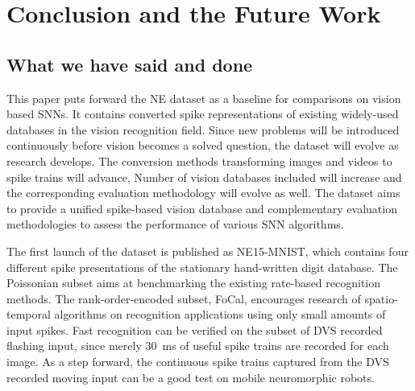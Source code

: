 \section{Conclusion and the Future Work}
\label{sec:summ}
\subsection{What we have said and done}
%
%

This paper puts forward the NE dataset as a baseline for comparisons on vision based SNNs.
It contains converted spike representations of existing widely-used databases in the vision recognition field.
Since new problems will be introduced continuously before vision becomes a solved question, the dataset will evolve as research develops. 
The conversion methods transforming images and videos to spike trains will advance, Number of vision databases included will increase and the corresponding evaluation methodology will evolve as well.
The dataset aims to provide a unified spike-based vision database and complementary evaluation methodologies to assess the performance of various SNN algorithms.

The first launch of the dataset is published as NE15-MNIST, which contains four different spike presentations of the stationary hand-written digit database.
The Poissonian subset aims at benchmarking the existing rate-based recognition methods.
The rank-order-encoded subset, FoCal, encourages research of spatio-temporal algorithms on recognition applications using only small amounts of input spikes.
Fast recognition can be verified on the subset of DVS recorded flashing input, since merely 30~ms of useful spike trains are recorded for each image.
As a step forward, the continuous spike trains captured from the DVS recorded moving input can be a good test on mobile neuromorphic robots.

